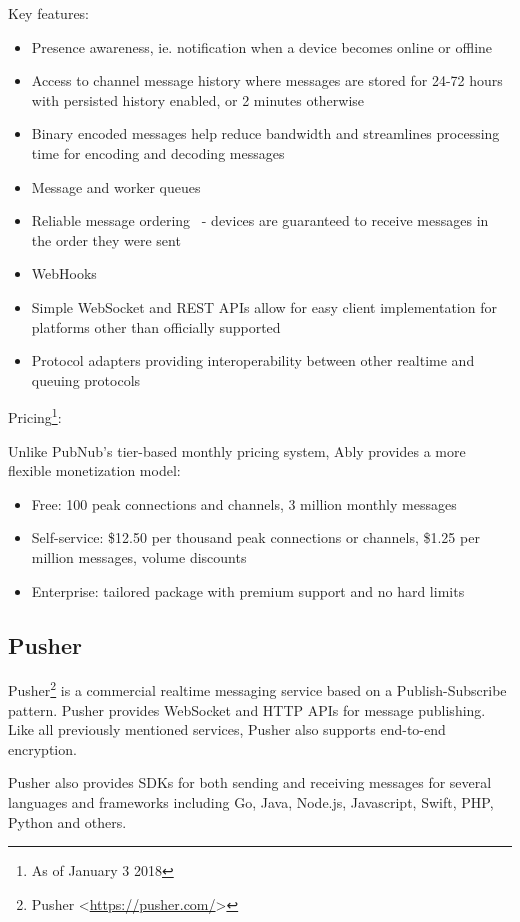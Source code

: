 Key features:
\begin{itemize}
\item Presence awareness, ie. notification when a device becomes online or offline
\item Access to channel message history where messages are stored for 24-72 hours~\protect\cite{ably-history} with persisted history enabled, or 2 minutes otherwise
\item Binary encoded messages help reduce bandwidth and streamlines processing time for encoding and decoding messages~\protect\cite{ably-bin-enc}
\item Message and worker queues
\item Reliable message ordering~\protect\cite{ably-order} - devices are guaranteed to receive messages in the order they were sent
\item WebHooks
\item Simple WebSocket and REST APIs allow for easy client implementation for platforms other than officially supported
\item Protocol adapters providing interoperability between other realtime and queuing protocols~\protect\cite{ably-adapters}
\end{itemize}

Pricing\footnote{As of January 3 2018}:

Unlike PubNub's tier-based monthly pricing system, Ably provides a more flexible monetization model:
\begin{itemize}
\item Free: 100 peak connections and channels, 3 million monthly messages
\item Self-service: \$12.50 per thousand peak connections or channels, \$1.25 per million messages, volume discounts
\item Enterprise: tailored package with premium support and no hard limits
\end{itemize}

\subsection{Pusher}
Pusher\footnote{Pusher <\url{https://pusher.com/}>} is a commercial realtime messaging service based on a Publish-Subscribe pattern. Pusher provides WebSocket and HTTP APIs for message publishing. Like all previously mentioned services, Pusher also supports end-to-end encryption.

Pusher also provides SDKs for both sending and receiving messages for several languages and frameworks including Go, Java, Node.js, Javascript, Swift, PHP, Python and others\cite{pusher-libs}. 

